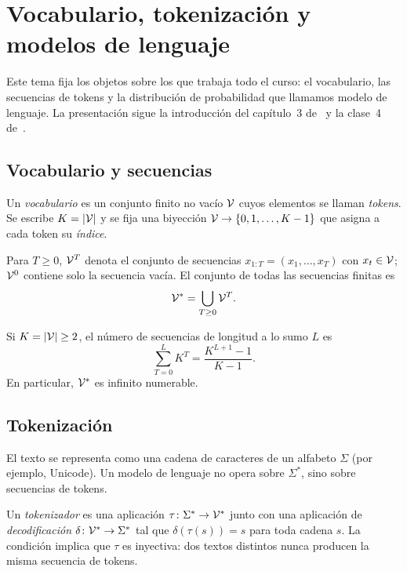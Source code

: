 \chapter{Vocabulario, tokenización y modelos de lenguaje}
\label{tema:1}

Este tema fija los objetos sobre los que trabaja todo el curso: el vocabulario, las secuencias de tokens y la distribución de probabilidad que llamamos modelo de lenguaje. La presentación sigue la introducción del capítulo~3 de~\cite{jm3} y la clase~4 de~\cite{cs224n}.

\section{Vocabulario y secuencias}

\begin{definicion}[Vocabulario]
Un \emph{vocabulario} es un conjunto finito no vacío $\mathcal{V}$ cuyos elementos se llaman \emph{tokens}. Se escribe $K=\lvert\mathcal{V}\rvert$ y se fija una biyección $\mathcal{V}\to\{0,1,\dots,K-1\}$ que asigna a cada token su \emph{índice}.
\end{definicion}

\begin{definicion}[Secuencias]
Para $T\ge 0$, $\mathcal{V}^{T}$ denota el conjunto de secuencias $x_{1:T}=(x_1,\dots,x_T)$ con $x_t\in\mathcal{V}$; $\mathcal{V}^{0}$ contiene solo la secuencia vacía. El conjunto de todas las secuencias finitas es
\[
\mathcal{V}^{*}=\bigcup_{T\ge 0}\mathcal{V}^{T}.
\]
\end{definicion}

\begin{proposicion}\label{prop:contar-secuencias}
Si $K=\lvert\mathcal{V}\rvert\ge 2$, el número de secuencias de longitud a lo sumo $L$ es
\[
\sum_{T=0}^{L} K^{T}=\frac{K^{L+1}-1}{K-1}.
\]
En particular, $\mathcal{V}^{*}$ es infinito numerable.
\end{proposicion}

\section{Tokenización}

El texto se representa como una cadena de caracteres de un alfabeto $\Sigma$ (por ejemplo, Unicode). Un modelo de lenguaje no opera sobre $\Sigma^{*}$, sino sobre secuencias de tokens.

\begin{definicion}[Tokenizador]
Un \emph{tokenizador} es una aplicación $\tau\colon\Sigma^{*}\to\mathcal{V}^{*}$ junto con una aplicación de \emph{decodificación} $\delta\colon\mathcal{V}^{*}\to\Sigma^{*}$ tal que $\delta(\tau(s))=s$ para toda cadena $s$. La condición implica que $\tau$ es inyectiva: dos textos distintos nunca producen la misma secuencia de tokens.
\end{definicion}

